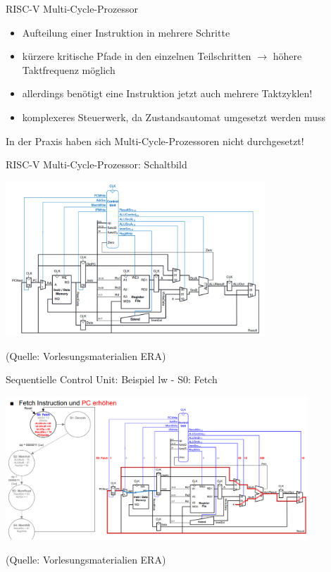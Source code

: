 \documentclass[
  german,            %
  aspectratio=169,    %
]{tumbeamer}
\begin{document}
\begin{frame}[c, fragile]{RISC-V Multi-Cycle-Prozessor}{}
	\begin{itemize}
		\item Aufteilung einer Instruktion in mehrere Schritte
		\item kürzere kritische Pfade in den einzelnen Teilschritten $\rightarrow$ höhere Taktfrequenz möglich
		\item allerdings benötigt eine Instruktion jetzt auch mehrere Taktzyklen!
		\item komplexeres Steuerwerk, da Zustandsautomat umgesetzt werden muss
	\end{itemize}
\begin{center}
			In der Praxis haben sich Multi-Cycle-Prozessoren nicht durchgesetzt!
\end{center}
\end{frame}

\begin{frame}[c]{RISC-V Multi-Cycle-Prozessor: Schaltbild}{}
	\begin{center}
		\includegraphics[width=0.73\textwidth]{w09_multicycle.png}
	\end{center}
	\centering
	\tiny (Quelle: Vorlesungsmaterialien ERA)
\end{frame}

\begin{frame}[c]{Sequentielle Control Unit: Beispiel lw - S0: Fetch}{}
	\begin{center}
		\includegraphics[width=0.85\textwidth]{w09_lw1_lv.png}
	\end{center}
	\centering
	\tiny (Quelle: Vorlesungsmaterialien ERA)
\end{frame}
\end{document}
